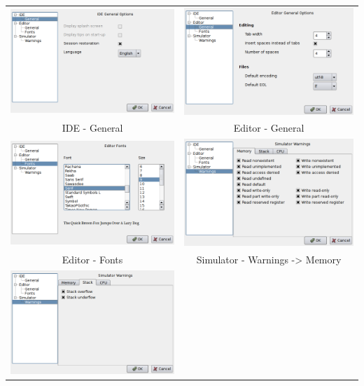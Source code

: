         \begin{table}[h!]
            \begin{tabular}{cc}
                \includegraphics[width=.4\textwidth]{img/interface1.png}
                    &
                \includegraphics[width=.4\textwidth]{img/interface2.png}
                    \\
                IDE - General & Editor - General
                    \\
                \includegraphics[width=.4\textwidth]{img/interface3.png}
                    &
                \includegraphics[width=.4\textwidth]{img/interface4.png}
                    \\
                Editor - Fonts & Simulator - Warnings -> Memory
                    \\
                \includegraphics[width=.4\textwidth]{img/interface5.png}

\end{tabular}
\end{table}
